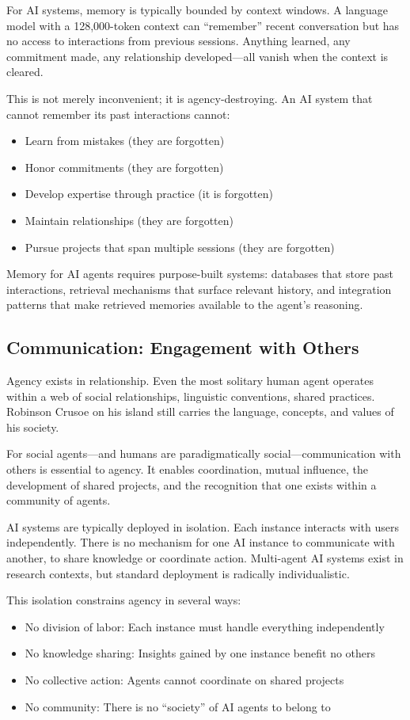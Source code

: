 For AI systems, memory is typically bounded by context windows. A language model with a 128,000-token context can ``remember'' recent conversation but has no access to interactions from previous sessions. Anything learned, any commitment made, any relationship developed---all vanish when the context is cleared.

This is not merely inconvenient; it is agency-destroying. An AI system that cannot remember its past interactions cannot:
\begin{itemize}
    \item Learn from mistakes (they are forgotten)
    \item Honor commitments (they are forgotten)
    \item Develop expertise through practice (it is forgotten)
    \item Maintain relationships (they are forgotten)
    \item Pursue projects that span multiple sessions (they are forgotten)
\end{itemize}

Memory for AI agents requires purpose-built systems: databases that store past interactions, retrieval mechanisms that surface relevant history, and integration patterns that make retrieved memories available to the agent's reasoning.

\subsection{Communication: Engagement with Others}

Agency exists in relationship. Even the most solitary human agent operates within a web of social relationships, linguistic conventions, shared practices. Robinson Crusoe on his island still carries the language, concepts, and values of his society.

For social agents---and humans are paradigmatically social---communication with others is essential to agency. It enables coordination, mutual influence, the development of shared projects, and the recognition that one exists within a community of agents.

AI systems are typically deployed in isolation. Each instance interacts with users independently. There is no mechanism for one AI instance to communicate with another, to share knowledge or coordinate action. Multi-agent AI systems exist in research contexts, but standard deployment is radically individualistic.

This isolation constrains agency in several ways:
\begin{itemize}
    \item No division of labor: Each instance must handle everything independently
    \item No knowledge sharing: Insights gained by one instance benefit no others
    \item No collective action: Agents cannot coordinate on shared projects
    \item No community: There is no ``society'' of AI agents to belong to
\end{itemize}

